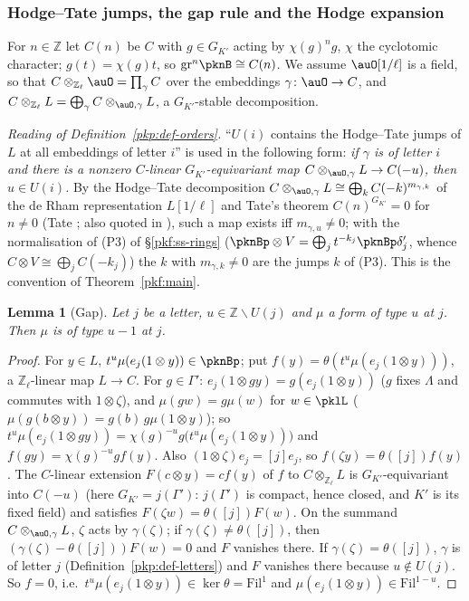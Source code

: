 \documentclass[10pt]{amsart}
\newtheorem{lemma}[theorem]{Lemma}
\theoremstyle{definition}
\theoremstyle{remark}
\newcommand{\Z}{\mathbb Z}
\begin{document}
\subsubsection{Hodge--Tate jumps, the gap rule and the Hodge expansion}\label{pkl:ss-gap}

For $n\in\Z$ let $C(n)$ be $C$ with $g\in G_{K'}$ acting by $\chi(g)^ng$, $\chi$ the cyclotomic character;
$g(t)=\chi(g)t$, so $\mathrm{gr}^n\pknB\cong C(n)$. We assume $\auO[1/\ell]$ is a field, so that
$C\otimes_{\Z_\ell}\auO=\prod_\gamma C$ over the embeddings $\gamma\colon\auO\to C$, and
$C\otimes_{\Z_\ell}L=\bigoplus_\gamma C\otimes_{\auO,\gamma}L$, a $G_{K'}$-stable decomposition.

\emph{Reading of Definition~\ref{pkp:def-orders}.} ``$U(i)$ contains the Hodge--Tate jumps of $L$ at all
embeddings of letter $i$'' is used in the following form: \emph{if $\gamma$ is of letter $i$ and there is a
nonzero $C$-linear $G_{K'}$-equivariant map $C\otimes_{\auO,\gamma}L\to C(-u)$, then $u\in U(i)$.} By the
Hodge--Tate decomposition $C\otimes_{\auO,\gamma}L\cong\bigoplus_kC(-k)^{m_{\gamma,k}}$ of the de Rham
representation $L[1/\ell]$ and Tate's theorem $C(n)^{G_{K'}}=0$ for $n\ne0$ (Tate \cite[\S3, Theorem~2, p.~176]{pklTate67}; also quoted in \cite[1.5.7]{pkfFontaineII}), such a map exists iff $m_{\gamma,u}\ne0$; with the normalisation of (P3) of \S\ref{pkf:ss-rings}
($\pknBp\otimes V=\bigoplus_jt^{-k_j}\pknBp\delta'_j$, whence $C\otimes V\cong\bigoplus_jC(-k_j)$) the $k$
with $m_{\gamma,k}\ne0$ are the jumps $k$ of (P3). This is the convention of Theorem~\ref{pkf:main}.

\begin{lemma}[Gap]\label{pkl:gap}
Let $j$ be a letter, $u\in\Z\smallsetminus U(j)$ and $\mu$ a form of type $u$ at $j$. Then $\mu$ is of
type $u-1$ at $j$.
\end{lemma}

\begin{proof}
For $y\in L$, $t^u\mu(e_j(1\otimes y))\in\pknBp$; put $f(y)=\theta(t^u\mu(e_j(1\otimes y)))$, a $\Z_\ell$-linear
map $L\to C$. For $g\in\Gamma'$: $e_j(1\otimes gy)=g(e_j(1\otimes y))$ ($g$ fixes $\Lambda$ and commutes with
$1\otimes\zeta$), and $\mu(gw)=g\mu(w)$ for $w\in\pklL$ ($\mu(g(b\otimes y))=g(b)\,g\mu(1\otimes y)$); so
$t^u\mu(e_j(1\otimes gy))=\chi(g)^{-u}g\bigl(t^u\mu(e_j(1\otimes y))\bigr)$ and $f(gy)=\chi(g)^{-u}gf(y)$. Also
$(1\otimes\zeta)e_j=[j]e_j$, so $f(\zeta y)=\theta([j])f(y)$. The $C$-linear extension $F(c\otimes y)=cf(y)$
of $f$ to $C\otimes_{\Z_\ell}L$ is $G_{K'}$-equivariant into $C(-u)$ (here $G_{K'}=j(\Gamma')$: $j(\Gamma')$ is compact, hence closed, and $K'$ is its fixed field) and satisfies $F(\zeta w)=\theta([j])F(w)$.
On the summand $C\otimes_{\auO,\gamma}L$, $\zeta$ acts by $\gamma(\zeta)$; if $\gamma(\zeta)\ne\theta([j])$, then
$(\gamma(\zeta)-\theta([j]))F(w)=0$ and $F$ vanishes there. If $\gamma(\zeta)=\theta([j])$, $\gamma$ is of letter
$j$ (Definition~\ref{pkp:def-letters}) and $F$ vanishes there because $u\notin U(j)$. So $f=0$, i.e.\
$t^u\mu(e_j(1\otimes y))\in\ker\theta=\mathrm{Fil}^1$ and $\mu(e_j(1\otimes y))\in\mathrm{Fil}^{1-u}$.
\end{proof}
\end{document}

